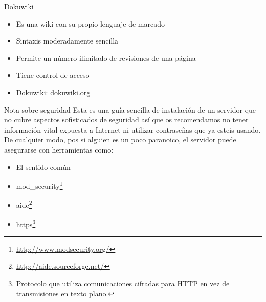 \documentclass[spanish]{beamer}
\begin{document}
\begin{frame}{Dokuwiki}
\begin{itemize}
\item Es una wiki con su propio lenguaje de marcado
\item Sintaxis moderadamente sencilla
\item Permite un número ilimitado de revisiones de una página
\item Tiene control de acceso
\item Dokuwiki: \url{dokuwiki.org}
\end{itemize}
\end{frame}

\begin{frame}{Nota sobre seguridad}
Esta es una guía sencilla de instalación de un servidor que no cubre aspectos sofisticados de seguridad así que os recomendamos no tener información vital expuesta a Internet ni utilizar contraseñas que ya esteis usando. De cualquier modo, pos si alguien es un poco paranoico, el servidor puede asegurarse con herramientas como:
\begin{itemize}
\item El sentido común
\item mod\_security\footnote{\url{http://www.modsecurity.org/}}
\item aide\footnote{\url{http://aide.sourceforge.net/}}
\item https\footnote{Protocolo que utiliza comunicaciones cifradas para HTTP en vez de transmisiones en texto plano.}
\end{itemize}
\end{frame}
\end{document}

